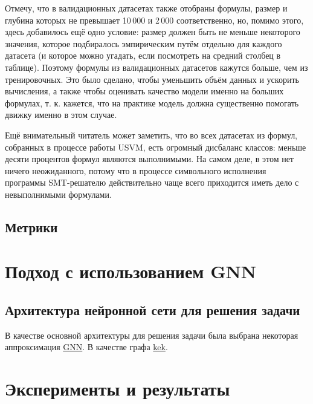 Отмечу, что в валидационных датасетах также отобраны формулы, размер и глубина которых не превышает 10\,000 и 2\,000 соответственно, но, помимо этого, здесь добавилось ещё одно условие: размер должен быть не меньше некоторого значения, которое подбиралось эмпирическим путём отдельно для каждого датасета (и которое можно угадать, если посмотреть на средний столбец в таблице). Поэтому формулы из валидационных датасетов кажутся больше, чем из тренировочных. Это было сделано, чтобы уменьшить объём данных и ускорить вычисления, а также чтобы оценивать качество модели именно на больших формулах, т. к. кажется, что на практике модель должна существенно помогать движку именно в этом случае.

Ещё внимательный читатель может заметить, что во всех датасетах из формул, собранных в процессе работы USVM, есть огромный дисбаланс классов: меньше десяти процентов формул являются выполнимыми. На самом деле, в этом нет ничего неожиданного, потому что в процессе символьного исполнения программы SMT-решателю действительно чаще всего приходится иметь дело с невыполнимыми формулами.


\subsection{Метрики}



\section{Подход с использованием GNN}

\subsection{Архитектура нейронной сети для решения задачи}

В качестве основной архитектуры для решения задачи была выбрана некоторая аппроксимация \hyperref[gnn-architecture]{GNN}. В качестве графа \hyperref[gnn-for-scheduling-of-smt-solvers]{kek}.




\section{Эксперименты и результаты}

